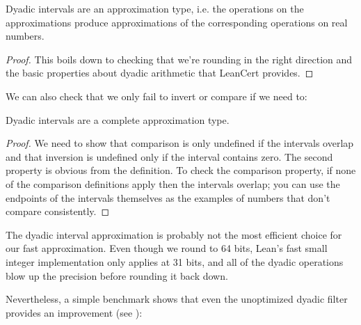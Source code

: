 \begin{lemma}
  \label{thm:dyadicApprox}
  \leanok
  Dyadic intervals are an approximation type, i.e. the operations on the
  approximations produce approximations of the corresponding operations on
  real numbers.
\end{lemma}

\begin{proof}
  \leanok
  This boils down to checking that we're rounding in the right direction and the
  basic properties about dyadic arithmetic that LeanCert provides.
\end{proof}

We can also check that we only fail to invert or compare if we need to:
\begin{lemma}
  \label{thm:dyadicComplete}
  \leanok
  Dyadic intervals are a complete approximation type.
\end{lemma}

\begin{proof}
  \leanok
  We need to show that comparison is only undefined if the intervals overlap and
  that inversion is undefined only if the interval contains zero. The second
  property is obvious from the definition. To check the comparison property, if
  none of the comparison definitions apply then the intervals overlap; you can
  use the endpoints of the intervals themselves as the examples of numbers that
  don't compare consistently.
\end{proof}

The dyadic interval approximation is probably not the most efficient choice for
our fast approximation. Even though we round to 64 bits, Lean's fast small
integer implementation only applies at 31 bits, and all of the dyadic operations
blow up the precision before rounding it back down.

Nevertheless, a simple benchmark shows that even the unoptimized dyadic filter
provides an improvement (see ):

